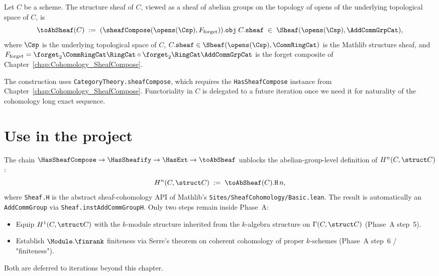 \begin{definition}
  \label{def:Scheme_toAbSheaf}
  Let $C$ be a scheme. The structure sheaf of $C$, viewed as a sheaf of abelian groups on the topology of opens of the underlying topological space of $C$, is
  \[
    \toAbSheaf(C) \;:=\; (\sheafCompose(\opens(\Csp), F_{\mathrm{forget}})).\mathtt{obj}\;C.\mathtt{sheaf} \;\in\; \Sheaf(\opens(\Csp), \AddCommGrpCat),
  \]
  where $\Csp$ is the underlying topological space of $C$, $C.\mathtt{sheaf} \in \Sheaf(\opens(\Csp), \CommRingCat)$ is the Mathlib structure sheaf, and $F_{\mathrm{forget}} = \forget_2 \CommRingCat \RingCat \circ \forget_2 \RingCat \AddCommGrpCat$ is the forget composite of Chapter~\ref{chap:Cohomology_SheafCompose}.
\end{definition}

The construction uses \lstinline{CategoryTheory.sheafCompose}, which requires the \lstinline{HasSheafCompose} instance from Chapter~\ref{chap:Cohomology_SheafCompose}. Functoriality in $C$ is delegated to a future iteration once we need it for naturality of the cohomology long exact sequence.

\section{Use in the project}

The chain $\HasSheafCompose \to \HasSheafify \to \HasExt \to \toAbSheaf$ unblocks the abelian-group-level definition of $H^n(C, \struct C)$:
\[
  H^n(C, \struct C) \;:=\; \toAbSheaf(C).\mathtt{H}\,n,
\]
where \lstinline{Sheaf.H} is the abstract sheaf-cohomology API of Mathlib's \lstinline{Sites/SheafCohomology/Basic.lean}. The result is automatically an \lstinline{AddCommGroup} via \lstinline{Sheaf.instAddCommGroupH}. Only two steps remain inside Phase~A:

\begin{itemize}
  \item Equip $H^1(C, \struct C)$ with the $k$-module structure inherited from the $k$-algebra structure on $\Gamma(C, \struct C)$ (Phase~A step~5).
  \item Establish $\Module.\finrank$ finiteness via Serre's theorem on coherent cohomology of proper $k$-schemes (Phase~A step~6 / "finiteness").
\end{itemize}

Both are deferred to iterations beyond this chapter.

